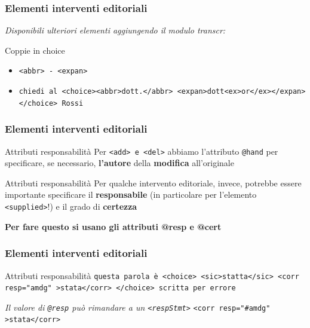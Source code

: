 \begin{frame}
    \frametitle{Elementi interventi editoriali}
    \addtocounter{nframe}{1}
    
    \textit{Disponibili ulteriori elementi aggiungendo il modulo transcr:}
    \begin{block}{Coppie in choice}
        \begin{itemize}
            \item \texttt{<abbr> - <expan>} 
            \item[] \texttt{chiedi al <choice><abbr>dott.</abbr> <expan>dott<ex>or</ex></expan></choice> Rossi}
        \end{itemize}
        
    \end{block}
    
\end{frame}

\begin{frame}
    \frametitle{Elementi interventi editoriali}
    \addtocounter{nframe}{1}
    

    \begin{block}{Attributi responsabilità}
        Per \texttt{<add> e <del>} abbiamo l’attributo \texttt{@hand} per specificare, se necessario, \textbf{l’autore} della \textbf{modifica} all’originale
    \end{block}
    \begin{block}{Attributi responsabilità}
        Per qualche intervento editoriale, invece, potrebbe essere importante specificare il \textbf{responsabile} (in particolare per l’elemento \texttt{<supplied>}!) e il grado di \textbf{certezza}
    \end{block}
    \textbf{Per fare questo si usano gli attributi @resp e @cert}
\end{frame}



\begin{frame}
    \frametitle{Elementi interventi editoriali}
    \addtocounter{nframe}{1}
    

    \begin{block}{Attributi responsabilità}
        \texttt{questa parola è <choice> <sic>statta</sic> <corr resp="amdg" >stata</corr> </choice> scritta per errore}
    \end{block}
    \textit{Il valore di \texttt{@resp} può rimandare a un \texttt{<respStmt>}}
    \texttt{<corr resp="\#amdg" >stata</corr>}
\end{frame}


